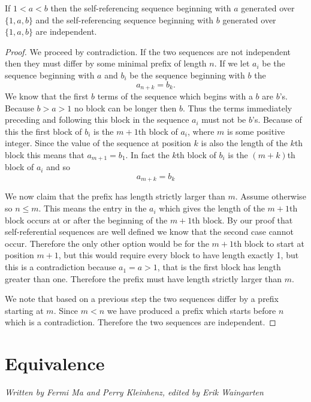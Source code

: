 \documentclass[runningheads,a4paper]{llncs}
\begin{document}
\begin{theorem}
\label{independentsequences}
If $1<a<b$ then the self-referencing sequence beginning with $a$ generated over $\{1, a, b\}$ and the self-referencing sequence beginning with $b$ generated over $\{1, a, b\}$ are independent.
\end{theorem}
\begin{proof}
We proceed by contradiction. If the two sequences are not independent then they must differ by some minimal prefix of length $n$. If we let $a_i$ be the sequence beginning with $a$ and $b_i$ be the sequence beginning with $b$ the
\begin{equation*}
a_{n+k} = b_{k}.
\end{equation*}
We know that the first $b$ terms of the sequence which begins with a $b$ are $b$'s. Because $b>a>1$ no block can be longer then $b$. Thus the terms immediately preceding and following this block in the sequence $a_i$ must not be $b$'s. Because of this the first block of $b_i$ is the $m+1$th block of $a_i$, where $m$ is some positive integer. Since the value of the sequence at position $k$ is also the length of the $k$th block this means that $a_{m+1}=b_1$. In fact the $k$th block of $b_i$ is the $(m+k)$th block of $a_i$ and so 
\begin{equation*}
a_{m+k} = b_k
\end{equation*}

We now claim that the prefix has length strictly larger than $m$. Assume otherwise so $n \leq m$. 
This means the entry in the $a_i$ which gives the length of the $m+1$th block occurs at or after the beginning of the $m+1$th block. By our proof that self-referential sequences are well defined we know that the second case cannot occur. Therefore the only other option would be for the $m+1$th block to start at position $m+1$, but this would require every block to have length exactly 1, but this is a contradiction because $a_1=a>1$, that is the first block has length greater than one. Therefore the prefix must have length strictly larger than $m$. 

We note that based on a previous step the two sequences differ by a prefix starting at $m$. Since $m<n$ we have produced a prefix which starts before $n$ which is a contradiction. Therefore the two sequences are independent. 
\end{proof}

\section{Equivalence}
\label{equivalence}
\emph{Written by Fermi Ma and Perry Kleinhenz, edited by Erik Waingarten}
\end{document}
